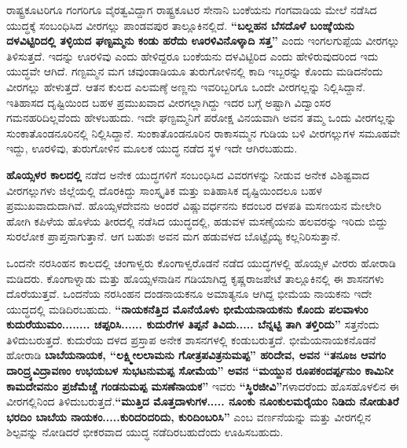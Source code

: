 ರಾಷ್ಟ್ರಕೂಟರಿಗೂ ಗಂಗರಿಗೂ ವೈರತ್ವವಿದ್ದಾಗ ರಾಷ್ಟ್ರಕೂಟರ ಸೇನಾನಿ ಬಂಕೆಯನು ಗಂಗವಾಡಿಯ ಮೇಲೆ ನಡೆಸಿದ ಯುದ್ಧಕ್ಕೆ ಸಂಬಂಧಿಸಿದ ವೀರಗಲ್ಲು ಪಾಂಡವಪುರ ತಾಲ್ಲೂಕಿನಲ್ಲಿದೆ. \textbf{“ಬಲ್ಲಹನ ಬೆಸದೊಳೆ ಬಂಙ್ಕೆಯನು ದಳವಿಟ್ಟಿರಿದಲ್ಲಿ ತಳ್ಳಿಯದ ಘಣ್ಟಮ್ಮನು ಕಂಡು ಹರೆದು ಊರಳಿವಿನೊಳ್ಕಾದಿ ಸತ್ತ”} ಎಂದು ಇಂಗಲಗುಪ್ಪೆಯ ವೀರಗಲ್ಲು ತಿಳಿಸುತ್ತದೆ. ಇದನ್ನು ಊರಳಿವು ಎಂದು ಹೇಳಿದ್ದರೂ ಬಂಕೆಯನು ದಳವಿಟ್ಟಿರಿದ ಎಂದು ಹೇಳಿರುವುದರಿಂದ ಇದು ಯುದ್ಧವೇ ಆಗಿದೆ. ಗಣ್ಟಮ್ಮನ ಮಗ ಚವುಂಡಾಡಿಯೂ ತುರುಗೋಳಿನಲ್ಲಿ ಕಾದಿ ಇಬ್ಬರನ್ನು ಕೊಂದು ಮಡಿದನೆಂದು ವೀರಗಲ್ಲು ಹೇಳುತ್ತದೆ. ಆತನ ಕುಲದ ಎಲಮಣ್ಠೆ ಅಣ್ಣನು ಇವರಿಬ್ಬರಿಗೂ ಒಂದೇ ವೀರಗಲ್ಲನ್ನು ನಿಲ್ಲಿಸಿದ್ದಾನೆ. ಇತಿಹಾಸದ ದೃಷ್ಟಿಯಿಂದ ಬಹಳ ಪ್ರಮುಖವಾದ ವೀರಗಲ್ಲಾಗಿದ್ದು ಇದರ ಬಗ್ಗೆ ಅಷ್ಟಾಗಿ ವಿದ್ವಾಂಸರ ಗಮನಹರಿದಿಲ್ಲವೆಂದು ಹೇಳಬಹುದು. ಇದೇ ಘಣ್ಟಮ್ಮನಿಗೆ ಪರೋಕ್ಷ ವಿನಯವಾಗಿ ಅವನ ತಮ್ಮ ಒಂದು ವೀರಗಲ್ಲನ್ನು ಸುಂಕಾತೊಂಡನೂರಿನಲ್ಲಿ ನಿಲ್ಲಿಸಿದ್ದಾನೆ. ಸುಂಕಾತೊಂಡನೂರಿನ ರಾಕಾಸಮ್ಮನ ಗುಡಿಯ ಬಳಿ ವೀರಗಲ್ಲುಗಳ ಸಮೂಹವೇ ಇದ್ದು, ಊರಳಿವು, ತುರುಗೋಳಿನ ಮೂಲಕ ಯುದ್ಧ ನಡೆದ ಸ್ಥಳ ಇದೇ ಆಗಿರಬಹುದು.

\textbf{ಹೊಯ್ಸಳರ ಕಾಲದಲ್ಲಿ} ನಡೆದ ಅನೇಕ ಯುದ್ಧಗಳಿಗೆ ಸಂಬಂಧಿಸಿದ ವಿವರಗಳನ್ನು ನೀಡುವ ಅನೇಕ ವಿಶಿಷ್ಟವಾದ ವೀರಗಲ್ಲುಗಳು ಜಿಲ್ಲೆಯಲ್ಲಿ ದೊರಕಿದ್ದು ಸಾಂಸ್ಕೃತಿಕ ಮತ್ತು ಐತಿಹಾಸಿಕ ದೃಷ್ಟಿಯಿಂದಲೂ ಬಹಳ ಪ್ರಮುಖವಾದುದಾಗಿವೆ. ಹೊಯ್ಸಳದೇವನು ಅಂದರೆ ವಿಷ್ಣುವರ್ಧನನು ಕದಂಬರ ದಳಪತಿ ಮಸಣಯನ ಮೇಲೇರಿ ಹೋಗಿ ಕಪಿಳೆಯ ಹೊಳೆಯ ತೀರದಲ್ಲಿ ನಡೆಸಿದ ಯುದ್ಧದಲ್ಲಿ, ಹಡುವಳ ಮಸಣೈಯನು ಹಲವರನ್ನು ಇರಿದು ಬಿದ್ದು ಸುರಲೋಕ ಪ್ರಾಪ್ತನಾಗುತ್ತಾನೆ. ಆಗ ಬಹುಶಃ ಅವನ ಮಗ ಹಡುವಳದ ಬೊಟ್ಟೈಯ್ಯ ಕಲ್ಲನಿರಿಸುತ್ತಾನೆ.

ಒಂದನೇ ನರಸಿಂಹನ ಕಾಲದಲ್ಲಿ ಚಂಗಾಳ್ವರು ಕೊಂಗಾಳ್ವರೊಡನೆ ನಡೆದ ಯುದ್ಧಗಳಲ್ಲಿ ಹೊಯ್ಸಳ ವೀರರು ಹೋರಾಡಿ ಮಡಿದರು. ಕೊಂಗಾಳ್ನಾಡು ಮತ್ತು ಹೊಯ್ಸಳನಾಡಿನ ಗಡಿಯಾಗಿದ್ದ ಕೃಷ್ಣರಾಜಪೇಟೆ ತಾಲ್ಲೂಕಿನಲ್ಲಿ ಈ ಶಾಸನಗಳು ದೊರೆಯುತ್ತವೆ. ಒಂದನೆಯ ನರಸಿಂಹನ ದಂಡನಾಯಕನೂ ಅಮಾತ್ಯನೂ ಆಗಿದ್ದ ಭೀಮೆಯ ನಾಯಕನು ಇದೇ ಯುದ್ಧದಲ್ಲಿ ಮಡಿದಿರಬಹುದು. \textbf{“ನಾಯಕನೆತ್ತಿದ ಮೊನೆಯೊಳು ಭೀಮೆಯನಾಯಕನು ಕೊಂದು ಪಲವಾಳುಂ ಕುದುರೆಯುಮಂ........ ಚಪ್ಪರಿಸಿ...... ಕುದುರೆಗಳ ತಿಪ್ಪನೆ ತಿವಿದು..... ಬೆನ್ನಟ್ಟಿ ತಾಗಿ ತಳ್ತಿರಿದು”} ಸತ್ತನೆಂದು ತಿಳಿದುಬರುತ್ತದೆ. ಕುದುರೆಯ ದಳದ ಪ್ರಸ್ತಾಪ ಅನೇಕ ಶಾಸನಗಳಲ್ಲಿ ಕಂಡುಬರುತ್ತದೆ. ಭೀಮೆಯನಾಯಕನೊಡನೆ ಹೋರಾಡಿ \textbf{ಬಾಬೆಯನಾಯಕ, “ಲಕ್ಷ್ಮೀಲಲಾಮನು ಗೋತ್ರಪವಿತ್ರನುಮಪ್ಪ” ಹರಿದೇವ, ಅವನ “ತನೂಜ ಆವಗಂ ದಾರಿದ್ರ್ಯವಿದ್ರಾವಣಂ ಉಭಯಬಳ ಸುಭಟನುಮಪ್ಪ ಸೋಮೆಯ” ಅವನ “ಮಯ್ದುನ ರೂಪಕಂದರ್ಪ್ಪನುಂ ಕಾಮಿನೀ ಕಾಮದೇವನುಂ ಪ್ರಜೆಮೆಚ್ಚೆ ಗಂಡನುಮಪ್ಪ ಮಸಣೆನಾಯಕ”} ಇವರು \textbf{“ಸ್ಥಿರಜೀವಿ”}ಗಳಾದರೆಂದು ಹೊಸಹೊಳಲಿನ ಈ ವೀರಗಲ್ಲಿನಿಂದ ತಿಳಿದು\-ಬರುತ್ತದೆ.\textbf{“ಮುತ್ತಿದ ಮೊತ್ತದಾಳುಗಳ..... ನೂಂಕು ನೂಂಕುಲಮರೈಯಂ ನಿಡಿದು ನೋಡುತಿರೆ ಭರದಿಂ ಬಾಬೆಯ ನಾಯಕಂ.....ಕುರಿದರಿದರಿದು, ಕುರಿದಿಂಬರಿಸಿ”} ಎಂಬ ವರ್ಣನೆಯನ್ನು ಮತ್ತು ವೀರಗಲ್ಲಿನ ಶಿಲ್ಪವನ್ನು ನೋಡಿದರೆ ಭೀಕರವಾದ ಯುದ್ಧ ನಡೆದಿರಬಹುದೆಂದು ಊಹಿಸಬಹುದು.

